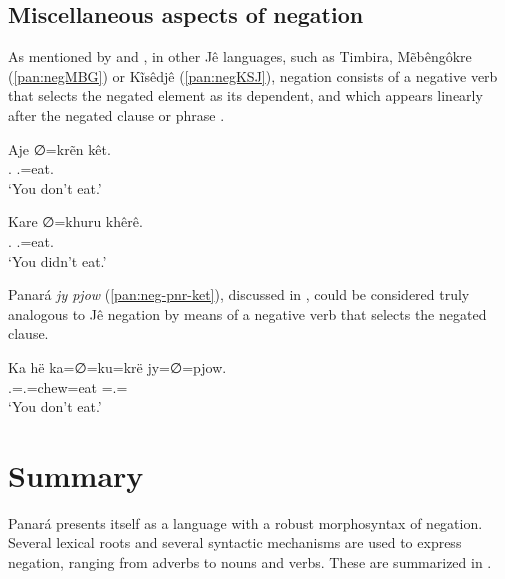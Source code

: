 \documentclass[output=paper,colorlinks,citecolor=brown,draft]{langscibook}
\begin{document}
\subsection{Miscellaneous aspects of negation}\label{pan:sec:other-misc}
As mentioned by \citet{Salanova2007} and \citet{Alves2010}, in other Jê languages, such as Timbira,  Mẽbêngôkre (\ref{pan:negMBG}) or Kĩsêdjê (\ref{pan:negKSJ}), negation consists of a negative verb that selects the negated element as its dependent, and which appears linearly after the negated clause or phrase \citep{Salanova:handbook, Alves-Gildea2020}. 

\ea\label{pan:negMBG}%
    \gll \ob Aje ∅=krẽn \cb{} kêt. \\
    \db \Ssg.\Erg{} \Tsg.\Abs{}=eat.\Nml{} \db{} \Neg{} \\
    \glt `You don't eat.' \\
\z

\ea\label{pan:negKSJ}%
    \gll \ob Kare ∅=khuru \cb{} khêrê. \\
    \db \Ssg.\Erg{} \Tsg.\Abs{}=eat.\Nml{} \phantom{1} \Neg{} \\
    \glt `You didn't eat.' \citep[7]{Nonato2014}\\ 
\z

Panará \textit{jy pjow } (\ref{pan:neg-pnr-ket}), discussed in , could be considered truly analogous to Jê negation by means of a negative verb that selects the negated clause.

\ea\label{pan:neg-pnr-ket}%
    \gll \ob Ka hë ka=∅=ku=krë \cb{} jy=∅=pjow.  \\
    \db  \Ssg{} \Erg{} \Ssg.\Erg{}=\Tsg.\Abs{}=chew=eat \db{} \Intr{}=\Tsg.\Abs{}=\Neg{} \\
    \glt `You don't eat.' \\
\z

\section{Summary}\label{pan:sec:conclusion}

Panará presents itself as a language with a robust morphosyntax of negation. Several lexical roots and several syntactic mechanisms are used to express negation, ranging from adverbs to nouns and verbs. These are summarized in . 
\end{document}
